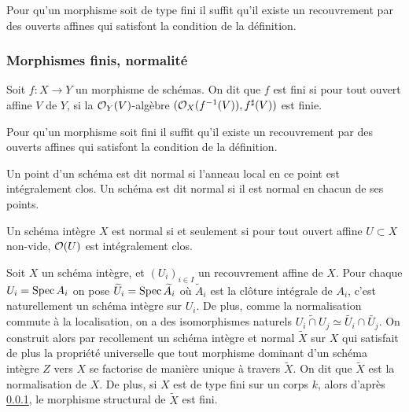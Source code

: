\begin{rem}
Pour qu'un morphisme soit de type fini il suffit qu'il existe un recouvrement par des ouverts affines qui satisfont la condition de la définition.
\end{rem}

\subsubsection{Morphismes finis, normalité}

\begin{defn}
Soit $f:X \rightarrow Y$ un morphisme de schémas. On dit que $f$ est fini si pour tout ouvert affine $V$ de $Y$, si la $\mathcal{O}_Y(V)$-algèbre $(\mathcal{O}_X(f^{-1}(V)), f^\sharp(V))$ est finie.
\end{defn}

\begin{rem}
Pour qu'un morphisme soit fini il suffit qu'il existe un recouvrement par des ouverts affines qui satisfont la condition de la définition.
\end{rem}


\begin{defn}
Un point d'un schéma est dit normal si l'anneau local en ce point est intégralement clos.
Un schéma est dit normal si il est normal en chacun de ses points.
\end{defn}

\begin{prop}
Un schéma intègre $X$ est normal si et seulement si pour tout ouvert affine $U\subset X$ non-vide, $\mathcal{O}(U)$ est intégralement clos.
\end{prop}

Soit $X$ un schéma intègre, et $(U_i)_{i\in I}$ un recouvrement affine de $X$. Pour chaque $U_i=\operatorname{Spec} A_i$ on pose $\widetilde{U}_i=\operatorname{Spec} \widetilde{A}_i$ où $\widetilde{A}_i$ est la clôture intégrale de $A_i$, c'est naturellement un schéma intègre sur $U_i$. De plus, comme la normalisation commute à la localisation, on a des isomorphismes naturels $\widetilde{U_i\cap U_j}\simeq \widetilde{U_i}\cap \widetilde{U_j}$. On construit alors par recollement un schéma intègre et normal $\widetilde{X}$ sur $X$ qui satisfait de plus la propriété universelle que tout morphisme dominant d'un schéma intègre $Z$ vers $X$ se factorise de manière unique à travers $\widetilde{X}$. On dit que $\widetilde{X}$ est la normalisation de $X$. De plus, si $X$ est de type fini sur un corps $k$, alors d'après \ref{}, le morphisme structural de $\widetilde{X}$ est fini.

